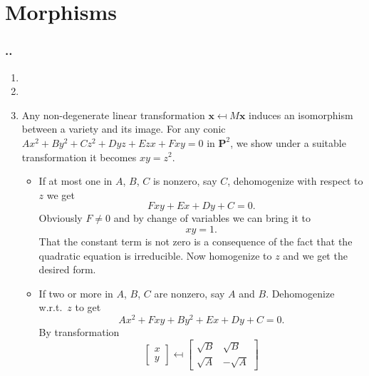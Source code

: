 \documentclass{note}
\newcounter{exercise}[section]
\newcommand{\Ex}{%
    \stepcounter{exercise}%
    \subsubsection*{\thesection.\arabic{exercise}.}%
}
\newcommand{\Proj}[1]{\mathbf{P}^{#1}}
\begin{document}
\section{Morphisms}



\Ex
\begin{enumerate}
  \item
  \item
  \item Any non-degenerate linear transformation $\mathbf{x} \mapsfrom M\mathbf{x}$
        induces an isomorphism between a variety and its image. For any conic $Ax^2 +
          By^2 + Cz^2 + Dyz + Ezx + Fxy = 0$ in $\Proj{2}$, we show under a suitable
        transformation it becomes $xy = z^2$.
        \begin{itemize}
          \item If at most one in $A$, $B$, $C$ is nonzero, say $C$, dehomogenize with respect
                to $z$ we get
                \begin{equation*}
                  Fxy + Ex + Dy + C = 0.
                \end{equation*}
                Obviously $F \ne 0$ and by change of variables we can bring it to
                \begin{equation*}
                  xy = 1.
                \end{equation*}
                That the constant term is not zero is a consequence of the fact that the
                quadratic equation is irreducible. Now homogenize to $z$ and we get the desired
                form.
          \item If two or more in $A$, $B$, $C$ are nonzero, say $A$ and $B$. Dehomogenize
                w.r.t.~$z$ to get
                \begin{equation*}
                  Ax^2 + Fxy + By^2 + Ex + Dy + C = 0.
                \end{equation*}
                By transformation
                \begin{equation*}
                  \begin{bmatrix}
                    x \\ y
                  \end{bmatrix}
                  \mapsfrom
                  \begin{bmatrix}
                    \sqrt{B} & \sqrt{B}  \\
                    \sqrt{A} & -\sqrt{A}


\end{bmatrix}
\end{equation*}
\end{itemize}
\end{enumerate}
\end{document}
